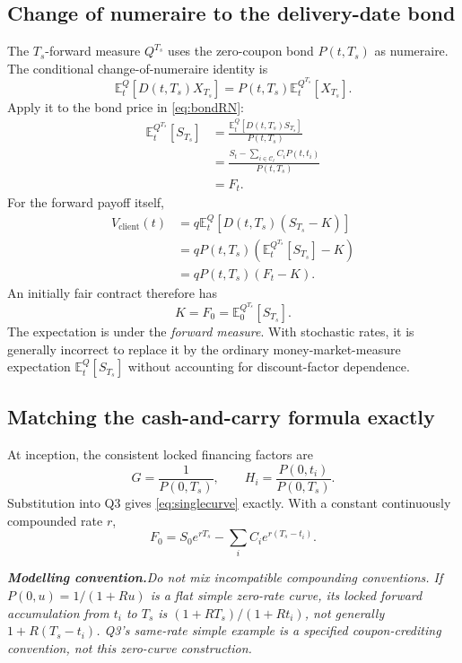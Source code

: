 \documentclass[11pt]{article}
\newcommand{\warningbox}[1]{\par\medskip\noindent\textit{\textbf{Modelling convention.}\enspace #1}\par\medskip}
\newcommand{\E}{\mathbb{E}}
\numberwithin{equation}{section}
\begin{document}
\subsection{Change of numeraire to the delivery-date bond}
The $T_s$-forward measure $Q^{T_s}$ uses the zero-coupon bond $P(t,T_s)$ as numeraire. The conditional change-of-numeraire identity is
\begin{equation}
\E_t^Q[D(t,T_s)X_{T_s}]
=P(t,T_s)\E_t^{Q^{T_s}}[X_{T_s}].
\end{equation}
Apply it to the bond price in \eqref{eq:bondRN}:
\begin{align}
\E_t^{Q^{T_s}}[S_{T_s}]
&=\frac{\E_t^Q[D(t,T_s)S_{T_s}]}{P(t,T_s)}\\
&=\frac{S_t-\sum_{i\in\mathcal C_t}C_iP(t,t_i)}{P(t,T_s)}\\
&=F_t.
\end{align}
For the forward payoff itself,
\begin{align}
V_{\mathrm{client}}(t)
&=q\E_t^Q[D(t,T_s)(S_{T_s}-K)]\\
&=qP(t,T_s)\left(\E_t^{Q^{T_s}}[S_{T_s}]-K\right)\\
&=qP(t,T_s)(F_t-K).
\end{align}
An initially fair contract therefore has
\begin{equation}
\boxed{K=F_0=\E_0^{Q^{T_s}}[S_{T_s}].}
\end{equation}
The expectation is under the \emph{forward measure}. With stochastic rates, it is generally incorrect to replace it by the ordinary money-market-measure expectation $\E_t^Q[S_{T_s}]$ without accounting for discount-factor dependence.

\subsection{Matching the cash-and-carry formula exactly}
At inception, the consistent locked financing factors are
\[
G=\frac1{P(0,T_s)},\qquad
H_i=\frac{P(0,t_i)}{P(0,T_s)}.
\]
Substitution into Q3 gives \eqref{eq:singlecurve} exactly. With a constant continuously compounded rate $r$,
\begin{equation}
F_0=S_0e^{rT_s}-\sum_iC_ie^{r(T_s-t_i)}.
\end{equation}

\warningbox{Do not mix incompatible compounding conventions. If $P(0,u)=1/(1+Ru)$ is a flat simple zero-rate curve, its locked forward accumulation from $t_i$ to $T_s$ is $(1+RT_s)/(1+Rt_i)$, not generally $1+R(T_s-t_i)$. Q3's same-rate simple example is a specified coupon-crediting convention, not this zero-curve construction.}
\end{document}

